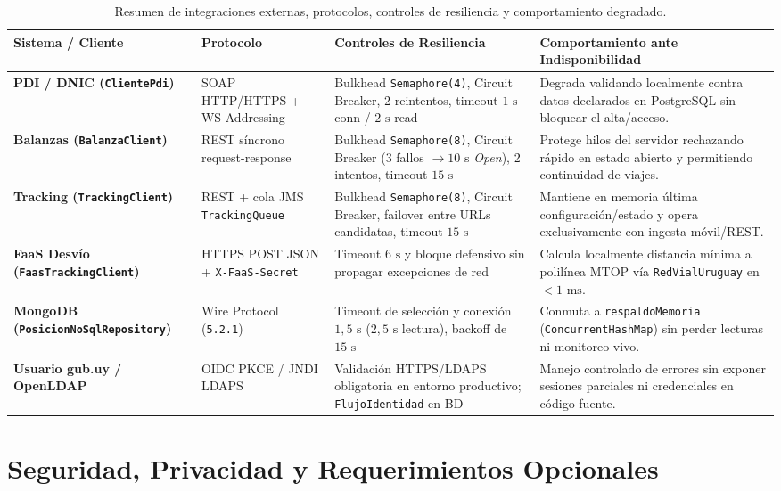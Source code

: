 \documentclass[11pt,a4paper,twocolumn]{article}
\begin{document}
\begin{table}[t]
\centering
\caption{Resumen de integraciones externas, protocolos, controles de resiliencia y comportamiento degradado.}
\label{tab:integraciones}
\scriptsize
\begin{tabularx}{\textwidth}{>{\bfseries}p{2.3cm} p{2.3cm} p{4.2cm} X}
\toprule
Sistema / Cliente & Protocolo & Controles de Resiliencia & Comportamiento ante Indisponibilidad \\
\midrule
PDI / DNIC (\texttt{ClientePdi}) & SOAP HTTP/HTTPS + WS-Addressing & Bulkhead \texttt{Semaphore(4)}, Circuit Breaker, 2 reintentos, timeout $1\text{ s}$ conn / $2\text{ s}$ read & Degrada validando localmente contra datos declarados en PostgreSQL sin bloquear el alta/acceso. \\
\midrule
Balanzas (\texttt{BalanzaClient}) & REST síncrono request-response & Bulkhead \texttt{Semaphore(8)}, Circuit Breaker ($3$ fallos $\rightarrow 10\text{ s}$ \textit{Open}), 2 intentos, timeout $15\text{ s}$ & Protege hilos del servidor rechazando rápido en estado abierto y permitiendo continuidad de viajes. \\
\midrule
Tracking (\texttt{TrackingClient}) & REST + cola JMS \texttt{TrackingQueue} & Bulkhead \texttt{Semaphore(8)}, Circuit Breaker, failover entre URLs candidatas, timeout $15\text{ s}$ & Mantiene en memoria última configuración/estado y opera exclusivamente con ingesta móvil/REST. \\
\midrule
FaaS Desvío (\texttt{FaasTrackingClient}) & HTTPS POST JSON + \texttt{X-FaaS-Secret} & Timeout $6\text{ s}$ y bloque defensivo sin propagar excepciones de red & Calcula localmente distancia mínima a polilínea MTOP vía \texttt{RedVialUruguay} en $<1\text{ ms}$. \\
\midrule
MongoDB (\texttt{PosicionNoSqlRepository}) & Wire Protocol (\texttt{5.2.1}) & Timeout de selección y conexión $1{,}5\text{ s}$ ($2{,}5\text{ s}$ lectura), backoff de $15\text{ s}$ & Conmuta a \texttt{respaldoMemoria} (\texttt{ConcurrentHashMap}) sin perder lecturas ni monitoreo vivo. \\
\midrule
Usuario gub.uy / OpenLDAP & OIDC PKCE / JNDI LDAPS & Validación HTTPS/LDAPS obligatoria en entorno productivo; \texttt{FlujoIdentidad} en BD & Manejo controlado de errores sin exponer sesiones parciales ni credenciales en código fuente. \\
\bottomrule
\end{tabularx}
\end{table}

\section{Seguridad, Privacidad y Requerimientos Opcionales}\label{sec:seguridad}
\end{document}

